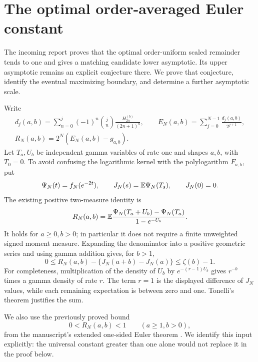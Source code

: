 \section{The optimal order-averaged Euler constant}
\label{ord:sec:main}
The incoming report \cite[Sections 2 and 9]{IncomingBounds} proves
that the optimal order-uniform scaled remainder tends to one and gives
a matching candidate lower asymptotic. Its upper asymptotic remains an
explicit conjecture there. We prove that conjecture, identify the eventual
maximizing boundary, and determine a further asymptotic scale.

Write
\[
 \begin{gathered}
 d_j(a,b)=\sum_{n=0}^j(-1)^n\binom jn
              \frac{H_{2n}^{(b)}}{(2n+1)^a},\qquad
 E_N(a,b)=\sum_{j=0}^{N-1}\frac{d_j(a,b)}{2^{j+1}},\\
 R_N(a,b)=2^N(E_N(a,b)-g_{a,b}).
 \end{gathered}
\]
Let $T_a,U_b$ be independent gamma variables of rate one and shapes
$a,b$, with $T_0=0$. To avoid confusing the logarithmic kernel with the
polylogarithm $F_{a,b}$, put
\begin{equation}\label{ord:eq:psi-J}
 \Psi_N(t)=f_N(e^{-2t}),\qquad J_N(s)=\mathbb E\Psi_N(T_s),\qquad J_N(0)=0.
\end{equation}
The existing positive two-measure identity is
\begin{equation}\label{ord:eq:remainder}
 R_N(a,b)=\mathbb E\frac{\Psi_N(T_a+U_b)-\Psi_N(T_a)}{1-e^{-U_b}}.
\end{equation}
It holds for $a\ge0,b>0$; in particular it does not require a finite
unweighted signed moment measure. Expanding the denominator into a
positive geometric series and using gamma addition gives, for $b>1$,
\begin{equation}\label{ord:eq:first-gamma}
 0\le R_N(a,b)-\{J_N(a+b)-J_N(a)\}\le\zeta(b)-1.
\end{equation}
For completeness, multiplication of the density of $U_b$ by
$e^{-(r-1)U_b}$ gives $r^{-b}$ times a gamma density of rate $r$.
The term $r=1$ is the displayed difference of $J_N$ values, while each
remaining expectation is between zero and one. Tonelli's theorem
justifies the sum.

We also use the previously proved bound
\begin{equation}\label{ord:eq:inherited-one}
 0<R_N(a,b)<1\qquad(a\ge1,b>0),
\end{equation}
from the manuscript's extended one-sided Euler theorem
\cite[Chapter 5, \texttt{05-real-euler.tex}]{ProveIt}. We identify this
input explicitly: the universal constant greater than one alone would
not replace it in the proof below.

